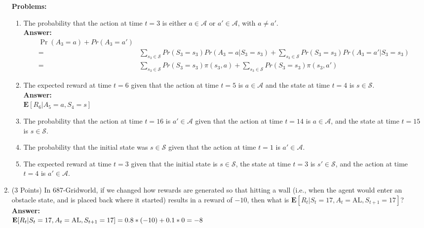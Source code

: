 \documentclass[]{article}
\begin{document}
\begin{enumerate}
\begin{itemize}
    \end{itemize}
    \textbf{Problems:}\\
    \begin{enumerate}[label=\Alph*]
        \item The probability that the action at time $t=3$ is either $ a \in \mathcal A$ or $a' \in \mathcal A$, with $a \ne a'$.
        \\
        \textbf{Answer: }\\
        \begin{align}
            \Pr(A_3=a)+Pr(A_3=a')\\
            =& \sum_{s_3\in \mathcal S} Pr(S_3=s_3) Pr(A_3=a|S_3=s_3)+\sum_{s_3\in \mathcal S} Pr(S_3=s_3) Pr(A_3=a'|S_3=s_3)\\
            =& \sum_{s_3\in \mathcal S} Pr(S_3=s_3) \pi(s_3,a)+\sum_{s_3\in \mathcal S} Pr(S_3=s_3) \pi(s_3,a')
        \end{align}

        \item The expected reward at time $t=6$ given that the action at time $t=5$ is $a \in \mathcal A$ and the state at time $t=4$ is $s\in \mathcal S$.
        \\
        \textbf{Answer: }\\
        $\mathbf{E}[R_6|A_5=a,S_4=s] $
        \item The probability that the action at time $t=16$ is $a' \in \mathcal A$ given that the action at time $t=14$ is $a \in \mathcal A$, and the state at time $t=15$ is $s \in \mathcal S$.
        
        \item The probability that the initial state was $s \in \mathcal S$ given that the action at time $t=1$ is $a' \in \mathcal A$. 
        
        \item The expected reward at time $t=3$ given that the initial state is $s \in \mathcal S$, the state at time $t=3$ is $s' \in \mathcal S$, and the action at time $t=4$ is $a' \in \mathcal A$.
       
    \end{enumerate}
    
    \item (3 Points) In 687-Gridworld, if we changed how rewards are generated so that hitting a wall (i.e., when the agent would enter an obstacle state, and is placed back where it started) results in a reward of $-10$, then what is $\mathbf{E}[R_t|S_t=17,A_t=\text{AL}, S_{t+1}=17]$?\\
    \textbf{Answer:}\\
    $\mathbf{E}[R_t|S_t=17,A_t=\text{AL}, S_{t+1}=17]\\
    =0.8*(-10)+0.1*0\\
    =-8$



\end{enumerate}
\end{document}
